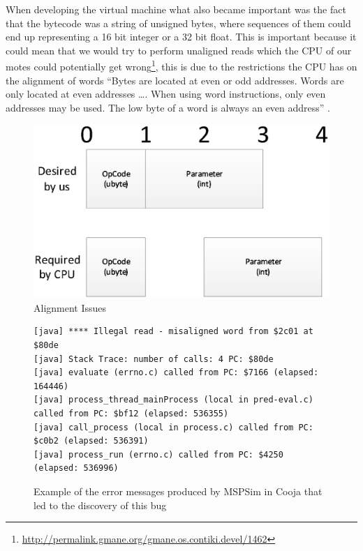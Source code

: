 When developing the virtual machine what also became important was the fact that the bytecode was a string of unsigned bytes, where sequences of them could end up representing a 16 bit integer or a 32 bit float. This is important because it could mean that we would try to perform unaligned reads which the CPU of our motes could potentially get wrong\footnote{\url{http://permalink.gmane.org/gmane.os.contiki.devel/1462}}, this is due to the restrictions the CPU has on the alignment of words ``Bytes are located at even or odd addresses. Words are only located at even addresses \ldots. When using word instructions, only even addresses may be used. The low byte of a word is always an even address'' \cite[Section~1.4.5 (p.~28)]{msp430usersguide}.

\begin{figure}[ht!]
\centering
\includegraphics[scale=0.75]{Diagrams/byte-alignment.eps}
\caption{Alignment Issues}
\label{fig:alignment-issues}
\end{figure}

\begin{figure}[ht!]
\begin{verbatim}
[java] **** Illegal read - misaligned word from $2c01 at $80de
[java] Stack Trace: number of calls: 4 PC: $80de
[java] evaluate (errno.c) called from PC: $7166 (elapsed: 164446)
[java] process_thread_mainProcess (local in pred-eval.c) called from PC: $bf12 (elapsed: 536355)
[java] call_process (local in process.c) called from PC: $c0b2 (elapsed: 536391)
[java] process_run (errno.c) called from PC: $4250 (elapsed: 536996)
\end{verbatim}
\caption{Example of the error messages produced by MSPSim in Cooja that led to the discovery of this bug}
\end{figure}


